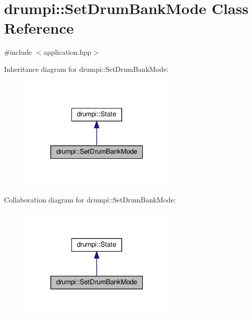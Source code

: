 \hypertarget{classdrumpi_1_1SetDrumBankMode}{}\section{drumpi\+:\+:Set\+Drum\+Bank\+Mode Class Reference}
\label{classdrumpi_1_1SetDrumBankMode}


{\ttfamily \#include $<$application.\+hpp$>$}



Inheritance diagram for drumpi\+:\+:Set\+Drum\+Bank\+Mode\+:
\nopagebreak
\begin{figure}[H]
\begin{center}
\leavevmode
\includegraphics[width=217pt]{classdrumpi_1_1SetDrumBankMode__inherit__graph}
\end{center}
\end{figure}


Collaboration diagram for drumpi\+:\+:Set\+Drum\+Bank\+Mode\+:
\nopagebreak
\begin{figure}[H]
\begin{center}
\leavevmode
\includegraphics[width=217pt]{classdrumpi_1_1SetDrumBankMode__coll__graph}
\end{center}
\end{figure}
